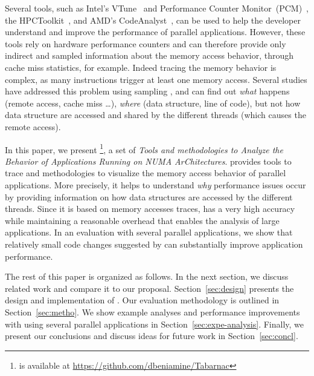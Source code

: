 Several tools, such as Intel's VTune~\cite{Reinders05VTune} and Performance Counter Monitor~(PCM)~\cite{Intel2012b}, the HPCToolkit~\cite{Adhianto10HPCTOOLKIT}, and AMD's CodeAnalyst~\cite{Drongowski2008}, can be used to help the
developer understand and improve the performance of parallel applications.
However, these tools rely on hardware performance counters and can therefore provide only indirect and sampled information about the memory access behavior, through cache miss statistics, for example.
Indeed tracing the memory behavior is complex, as many instructions trigger at least one memory access.
Several studies have addressed this problem using sampling
\cite{Lachaize12MemProf,McCurdy2010,Gimenez14Dissecting},
and can find out \emph{what} happens (remote access, cache miss \ldots),
\emph{where} (data structure, line of code), but not how data structure are
accessed and shared by the different threads (which causes the remote access).

In this paper, we present \TABARNAC\footnote{\TABARNAC is available at
    \url{https://github.com/dbeniamine/Tabarnac}}, a set of \emph{Tools and
    methodologies to Analyze the Behavior of
Applications Running on NUMA ArChitectures}. \TABARNAC provides tools to trace
and methodologies to visualize the memory access behavior of parallel
applications. More precisely, it helps to understand \emph{why} performance
issues occur by providing information on how data structures are accessed by the
different threads.
Since it is based on memory accesses traces, \TABARNAC has a very high
accuracy while maintaining a reasonable overhead that enables the analysis of large applications.
In an evaluation with several parallel applications, we show that relatively small code changes suggested by \TABARNAC can substantially improve application performance.

The rest of this paper is organized as follows.
In the next section, we discuss related work and compare it to our proposal.
Section~\ref{sec:design} presents the design and implementation of \TABARNAC.
Our evaluation methodology is outlined in Section~\ref{sec:metho}.
We show example analyses and performance improvements with \TABARNAC using several parallel applications in Section~\ref{sec:expe-analysis}.
Finally, we present our conclusions and discuss ideas for future work in Section~\ref{sec:concl}.
